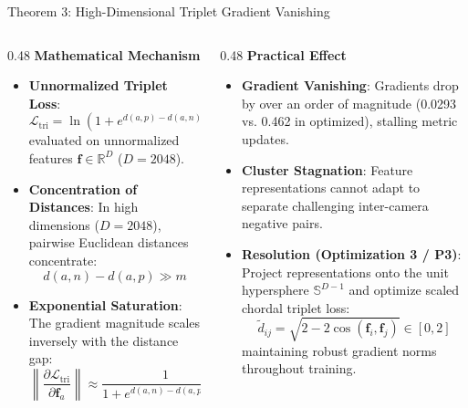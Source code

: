 \documentclass[aspectratio=169,xcolor=dvipsnames]{beamer}
\begin{document}
\begin{frame}{Theorem 3: High-Dimensional Triplet Gradient Vanishing}
\footnotesize
\setlength{\abovedisplayskip}{4pt}
\setlength{\belowdisplayskip}{4pt}
\begin{columns}[t,onlytextwidth]
\begin{column}{0.48\textwidth}
    \textbf{Mathematical Mechanism}
    \begin{itemize}
        \setlength{\itemsep}{0.10em}
        \item \textbf{Unnormalized Triplet Loss}:
        $$\mathcal{L}_{\text{tri}} = \ln\left(1 + e^{d(a, p) - d(a, n) + m}\right)$$
        evaluated on unnormalized features $\mathbf{f} \in \mathbb{R}^D$ ($D=2048$).
        \item \textbf{Concentration of Distances}: In high dimensions ($D=2048$), pairwise Euclidean distances concentrate:
        $$d(a, n) - d(a, p) \gg m$$
        \item \textbf{Exponential Saturation}: The gradient magnitude scales inversely with the distance gap:
        $$\left\| \frac{\partial \mathcal{L}_{\text{tri}}}{\partial \mathbf{f}_a} \right\| \approx \frac{1}{1 + e^{d(a, n) - d(a, p) - m}} \to 0.0293$$
    \end{itemize}
\end{column}
\begin{column}{0.48\textwidth}
    \textbf{Practical Effect}
    \begin{itemize}
        \setlength{\itemsep}{0.10em}
        \item \textbf{Gradient Vanishing}: Gradients drop by over an order of magnitude (0.0293 vs. 0.462 in optimized), stalling metric updates.
        \item \textbf{Cluster Stagnation}: Feature representations cannot adapt to separate challenging inter-camera negative pairs.
        \item \textbf{Resolution (Optimization 3 / P3)}: Project representations onto the unit hypersphere $\mathbb{S}^{D-1}$ and optimize scaled chordal triplet loss:
        $$\tilde{d}_{ij} = \sqrt{2 - 2\cos(\mathbf{f}_i, \mathbf{f}_j)} \in [0, 2]$$
        maintaining robust gradient norms throughout training.
    \end{itemize}
\end{column}
\end{columns}
\end{frame}
\end{document}
